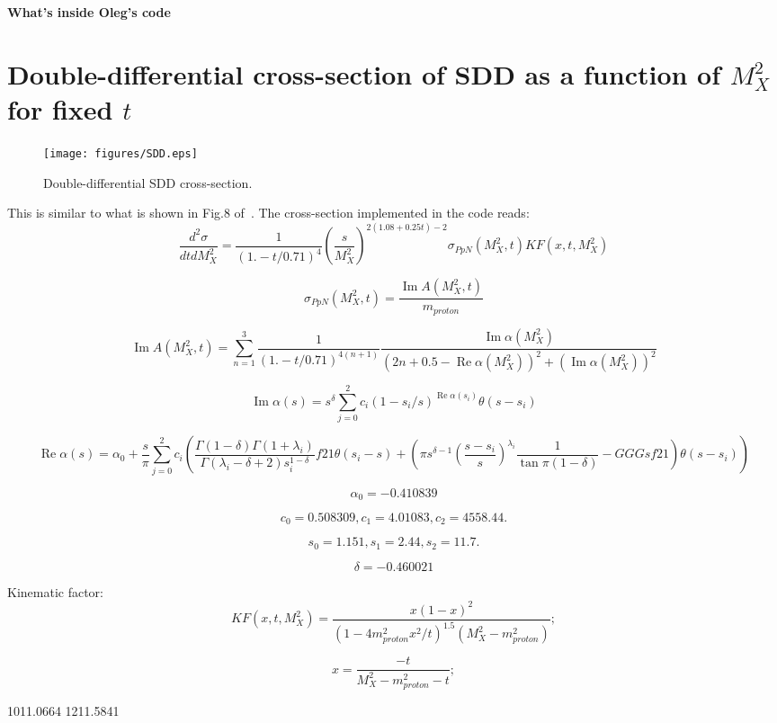 \documentclass[12pt]{article}
\renewcommand{\Re}{\operatorname{Re}}
\renewcommand{\Im}{\operatorname{Im}}
\begin{document}
\vskip 0.5cm \centerline{\bf\Large What's inside Oleg's code}
\vskip 1cm

\section{Double-differential cross-section of SDD as a function of $M_X^2$ for fixed $t$}
\begin{figure}[!h]
\centering
\texttt{[image: figures/SDD.eps]}
\caption{Double-differential SDD cross-section.}
\label{fig:diagrams}
\end{figure}
This is similar to what is shown in Fig.8 of~\cite{Jenkovszky11}.
The cross-section implemented in the code reads:
$$
\frac{d^2\sigma}{dt dM_X^2}=\frac{1}{(1. - t/0.71)^4} \left(\frac{s}{M_X^2}\right)^{2(1.08 + 0.25t) - 2} \sigma_{PpN}(M_X^2,t) KF(x,t,M_X^2)
$$

$$
\sigma_{PpN}(M_X^2,t)=\frac{\Im A(M_X^2,t)}{m_{proton}}
$$

$$
\Im A(M_X^2,t) = \sum_{n=1}^{3}\frac{1}{(1. - t/0.71)^{4(n+1)}} \frac{\Im\alpha(M_X^2)}{(2 n +0.5-\Re\alpha(M_X^2))^2+(\Im\alpha(M_X^2))^2}
$$

$$
\Im\alpha(s) = s^\delta \sum_{j=0}^{2} c_i (1-s_i/s)^{\Re\alpha(s_i)} \theta(s-s_i) 
$$

$$
\Re\alpha(s) =  \alpha_0 + \frac{s}{\pi} \sum_{j=0}^{2} c_i (\frac{\Gamma(1-\delta) \Gamma(1+\lambda_i)}{\Gamma(\lambda_i-\delta+2) s_i^{1-\delta}} f21 \theta(s_i-s) + (\pi s^{\delta-1} \left(\frac{s-s_i}{s}\right)^{\lambda_i} \frac{1}{\tan{\pi (1-\delta)}} - GGGsf21) \theta(s-s_i))
$$

$$
\alpha_0=-0.410839
$$

$$
c_0=  0.508309,
c_1 = 4.01083,
c_2 = 4558.44.
$$
  
$$
s_0=  1.151,
s_1 = 2.44,
s_2 = 11.7.
$$

$$
\delta=-0.460021
$$

Kinematic factor:
$$
KF(x,t,M_X^2) = \frac{x (1-x)^2}{\left(1 - 4m_{proton}^2x^2/t\right)^{1.5}(M_X^2-m_{proton}^2)};
$$

$$
x = \frac{-t}{M_X^2 - m_{proton}^2 - t};
$$




\begin{thebibliography}{99}
 1011.0664
 1211.5841
\end{thebibliography}
\end{document}
